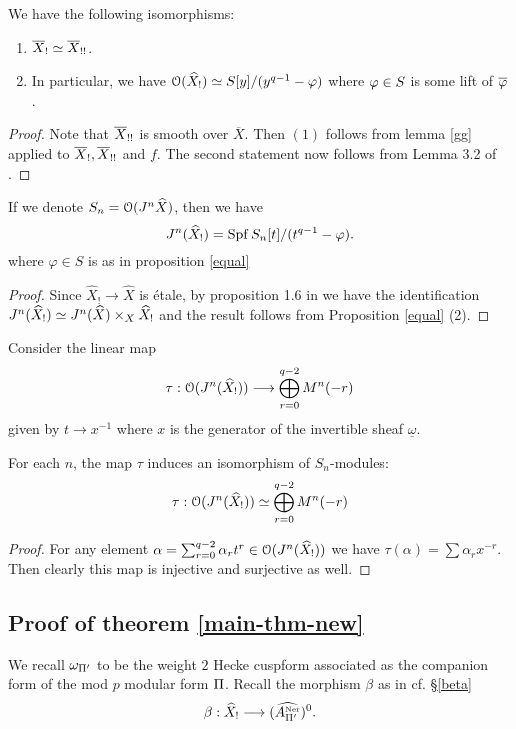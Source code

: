 \documentclass{amsart}
\newcommand{\uomega}{\underline{\omega}}
\numberwithin{equation}{section}
\def \mb{\mbox}
\newcommand{\ner}{\mb{\tiny Ner}}
\DeclareMathOperator{\Spf}{\mathrm{Spf}}
\newcommand{\obar}[1]{\overline{#1}}
\begin{document}
\begin{prop}
\label{equal}
We have the following isomorphisms:
\begin{enumerate}
\item
 $\overline{X}_! \simeq \overline{X}_{!!} $.
 \item
In particular, we have
$\mathcal{O}({\widehat{X}}_!) \simeq S[y]/(y^{q-1}-\varphi)$ where $\varphi \in S$ is some lift of 
$\obar{\vp}$.
 \end{enumerate}
\end{prop}

\begin{proof}
Note that $\overline{X}_{!!}$ is smooth over $\overline{X}$. Then $(1)$ 
follows from lemma \ref{gg} applied to $\overline{X}_!, \overline{X}_{!!}$ and $f$.
The second statement now follows from Lemma 3.2 of \cite{MR3349440}. 
\end{proof}

\begin{lemma}
\label{mainlemma}
If  we denote $S_n=\mathcal{O}(J^n\widehat{X})$, then we have
$$J^n(\wh{X}_!) = \Spf S_n[t]/(t^{q-1} - \varphi).$$
where $\varphi \in S$ is as in proposition \ref{equal}
\end{lemma}
\begin{proof}

Since $\widehat{X}_! \rightarrow \widehat{X}$ is \'etale, by proposition 1.6
in \cite{MR1748272} we have the 
identification $J^n(\widehat{X}_!) \simeq J^n(\widehat{X}) \times_X \widehat{X}_!$
and the result follows from Proposition \ref{equal} (2). 
\end{proof}

Consider the linear map 
$$\tau:\mathcal{O}(J^n(\widehat{X}_!) ) \longrightarrow \bigoplus_{r=0}^{q-2}  M^n(-r)$$
given by $t \rightarrow x^{-1}$ where $x$ is the generator of the invertible 
sheaf $\uomega$. 

\begin{prop}
\label{mainprop}
For each $n$, the map $\tau$ induces an isomorphism of $S_n$-modules: 
$$\tau:\mathcal{O}(J^n(\widehat{X}_!) ) \simeq \bigoplus_{r=0}^{q-2}  M^n(-r)$$
\end{prop}
\begin{proof}
For any element $\alpha = \sum_{r=0}^{q-2} \alpha_r t^r \in 
\mathcal{O}(J^n(\widehat{X}_!) )$ we have  $\tau(\alpha)= \sum \alpha_r x^{-r}$.
Then clearly this map is injective and surjective as well.
\end{proof}

\subsection{Proof of theorem \ref{main-thm-new}}
We recall $\omega_{\Pi'}$ to be the weight $2$ Hecke cuspform
associated as the companion form of the mod $p$ modular form $\Pi$.
Recall the morphism 
$\beta$ as in cf. \S\ref{beta}
$$ \beta: \ohat{X}_! \longrightarrow (\ohat{A_{\pip'}^{\ner}})^0.$$
\end{document}
